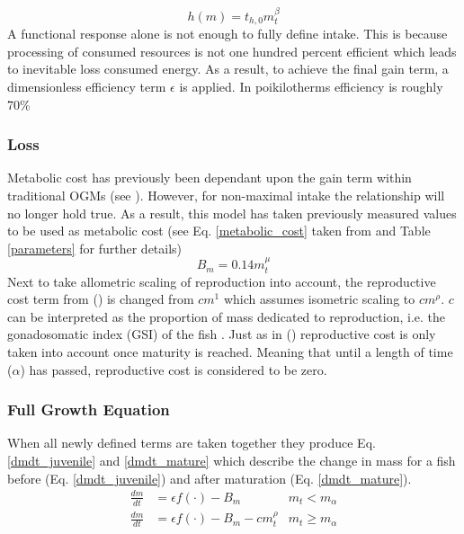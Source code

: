 \documentclass[a4paper, 11pt, hidelinks]{article} %
\begin{document}
	\begin{equation}
		\label{handling_time}
		h(m) = t_{h,0} m_t^\beta
	\end{equation}
	A functional response alone is not enough to fully define intake.  This is because processing of consumed resources is not one hundred percent efficient which leads to inevitable loss consumed energy.  As a result, to achieve the final gain term, a dimensionless efficiency term $\epsilon$ is applied.  In poikilotherms efficiency is roughly 70\% \parencite{Peters1983}
	
	\subsubsection{Loss}
	Metabolic cost  has previously been dependant upon the gain term within traditional OGMs (see \cite{West2001, Hou2008}).  However, for non-maximal intake the relationship will no longer hold true.  As a result, this model has taken previously measured values to be used as metabolic cost (see Eq. \ref{metabolic_cost} taken from \cite{Peters1983} %
	and Table \ref{parameters} for further details)
	\begin{equation}
		\label{metabolic_cost}
		B_m = 0.14 m_t^\mu
	\end{equation}
	Next to take allometric scaling of reproduction into account, the reproductive cost term from \citeauthor{Charnov2001} (\citeyear{Charnov2001}) is changed from $cm^1$ which assumes isometric scaling to $cm^\rho$.  $c$ can be interpreted as the proportion of mass dedicated to reproduction, i.e. the gonadosomatic index (GSI) of the fish \parencite{Charnov2001}.  Just as in \citeauthor{Charnov2001} (\citeyear{Charnov2001}) reproductive cost is only taken into account once maturity is reached.  Meaning that until a length of time ($\alpha$) has passed, reproductive cost is considered to be zero.
	
	\subsubsection{Full Growth Equation}
	When all newly defined terms are taken together they produce Eq. \ref{dmdt_juvenile}  and \ref{dmdt_mature} which describe the change in mass for a fish before (Eq. \ref{dmdt_juvenile}) and after maturation (Eq. \ref{dmdt_mature}).
	\begin{align}
		\label{dmdt_juvenile}
		\frac{dm}{dt} &= \epsilon f(\cdot) - B_m & m_t < m_\alpha \\
		\label{dmdt_mature}
		\frac{dm}{dt} &= \epsilon f(\cdot) - B_m - cm_t^\rho & m_t \geq m_\alpha
	\end{align}
\end{document}
